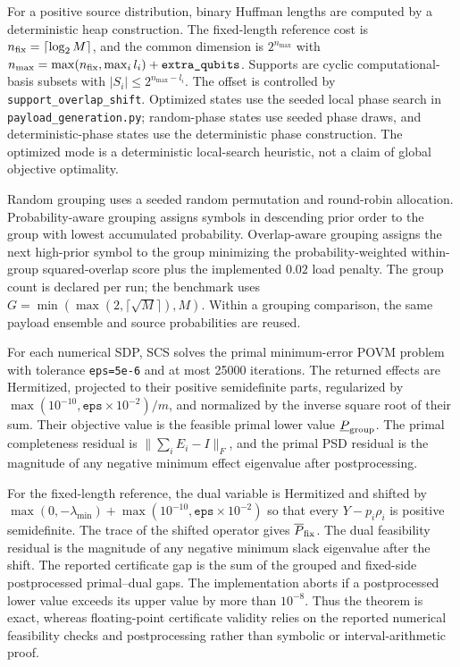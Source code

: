 For a positive source distribution, binary Huffman lengths are computed by a deterministic heap construction. The fixed-length reference cost is $n_{\rm fix}=\lceil\log_2 M\rceil$, and the common dimension is $2^{n_{\max}}$ with $n_{\max}=\max(n_{\rm fix},\max_i l_i)+\texttt{extra\_qubits}$. Supports are cyclic computational-basis subsets with $|S_i|\le 2^{n_{\max}-l_i}$. The offset is controlled by \texttt{support\_overlap\_shift}. Optimized states use the seeded local phase search in \texttt{payload\_generation.py}; random-phase states use seeded phase draws, and deterministic-phase states use the deterministic phase construction. The optimized mode is a deterministic local-search heuristic, not a claim of global objective optimality.

Random grouping uses a seeded random permutation and round-robin allocation. Probability-aware grouping assigns symbols in descending prior order to the group with lowest accumulated probability. Overlap-aware grouping assigns the next high-prior symbol to the group minimizing the probability-weighted within-group squared-overlap score plus the implemented $0.02$ load penalty. The group count is declared per run; the benchmark uses $G=\min(\max(2,\lceil\sqrt M\rceil),M)$. Within a grouping comparison, the same payload ensemble and source probabilities are reused.

For each numerical SDP, SCS solves the primal minimum-error POVM problem with tolerance \texttt{eps=5e-6} and at most 25000 iterations. The returned effects are Hermitized, projected to their positive semidefinite parts, regularized by $\max(10^{-10},\texttt{eps}\times10^{-2})/m$, and normalized by the inverse square root of their sum. Their objective value is the feasible primal lower value $\underline P_{\rm group}$. The primal completeness residual is $\|\sum_iE_i-I\|_F$, and the primal PSD residual is the magnitude of any negative minimum effect eigenvalue after postprocessing.

For the fixed-length reference, the dual variable is Hermitized and shifted by $\max(0,-\lambda_{\min})+\max(10^{-10},\texttt{eps}\times10^{-2})$ so that every $Y-p_i\rho_i$ is positive semidefinite. The trace of the shifted operator gives $\overline P_{\rm fix}$. The dual feasibility residual is the magnitude of any negative minimum slack eigenvalue after the shift. The reported certificate gap is the sum of the grouped and fixed-side postprocessed primal--dual gaps. The implementation aborts if a postprocessed lower value exceeds its upper value by more than $10^{-8}$. Thus the theorem is exact, whereas floating-point certificate validity relies on the reported numerical feasibility checks and postprocessing rather than symbolic or interval-arithmetic proof.

